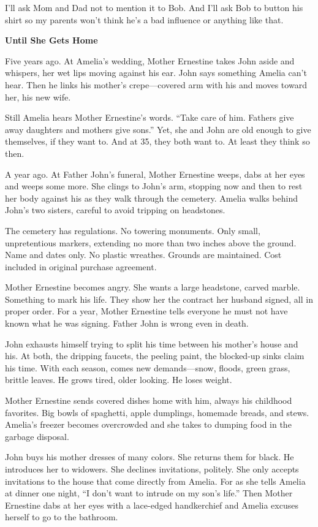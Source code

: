 \documentclass[
]{article}
\begin{document}
I'll ask Mom and Dad not to mention it to Bob. And I'll ask Bob to
button his shirt so my parents won't think he's a bad influence or
anything like that.

\textbf{\hfill\break
}

\textbf{Until She Gets Home}

Five years ago. At Amelia's wedding, Mother Ernestine takes John aside
and whispers, her wet lips moving against his ear. John says something
Amelia can't hear. Then he links his mother's crepe---covered arm with
his and moves toward her, his new wife.

Still Amelia hears Mother Ernestine's words. ``Take care of him. Fathers
give away daughters and mothers give sons.'' Yet, she and John are old
enough to give themselves, if they want to. And at 35, they both want
to. At least they think so then.

A year ago. At Father John's funeral, Mother Ernestine weeps, dabs at
her eyes and weeps some more. She clings to John's arm, stopping now and
then to rest her body against his as they walk through the cemetery.
Amelia walks behind John's two sisters, careful to avoid tripping on
headstones.

The cemetery has regulations. No towering monuments. Only small,
unpretentious markers, extending no more than two inches above the
ground. Name and dates only. No plastic wreathes. Grounds are
maintained. Cost included in original purchase agreement.

Mother Ernestine becomes angry. She wants a large headstone, carved
marble. Something to mark his life. They show her the contract her
husband signed, all in proper order. For a year, Mother Ernestine tells
everyone he must not have known what he was signing. Father John is
wrong even in death.

John exhausts himself trying to split his time between his mother's
house and his. At both, the dripping faucets, the peeling paint, the
blocked-up sinks claim his time. With each season, comes new
demands---snow, floods, green grass, brittle leaves. He grows tired,
older looking. He loses weight.

Mother Ernestine sends covered dishes home with him, always his
childhood favorites. Big bowls of spaghetti, apple dumplings, homemade
breads, and stews. Amelia's freezer becomes over­crowded and she takes
to dumping food in the garbage disposal.

John buys his mother dresses of many colors. She returns them for black.
He introduces her to widowers. She declines invitations, politely. She
only accepts invitations to the house that come directly from Amelia.
For as she tells Amelia at dinner one night, ``I don't want to intrude
on my son's life.'' Then Mother Ernestine dabs at her eyes with a
lace-edged handkerchief and Amelia excuses her­self to go to the
bathroom.
\end{document}
